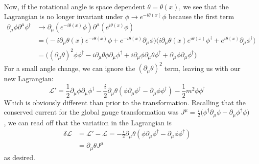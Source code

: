 \documentclass[12pt]{article}
\newcommand{\delmu}{\partial_{\mu}}
\newcommand{\delMu}{\partial^{\mu}}
\newcommand{\+}{\dagger}
\begin{document}
Now, if the rotational angle is space dependent $\theta = \theta(x)$, we see
that the Lagrangian is no longer invariant under $\phi \to e^{-i\theta(x)}\phi$
because the first term
\begin{align*}
    \delmu\phi\delMu\phi^{\dagger} &\to
    \delmu(e^{-i\theta(x)}\phi)\delMu(e^{i\theta(x)}\phi) \\ 
                                   &=
    \big(-i\delmu\theta(x)e^{-i\theta(x)}\phi + e^{-i\theta(x)}\delmu\phi \big)
    \big(i\delmu\theta(x)e^{i\theta(x)}\phi^{\dagger} +
    e^{i\theta(x)}\delmu\phi^{\dagger} \big) \\
                                   &=
    \big(
        (\delmu\theta)^2\phi\phi^{\+} -i\delmu\theta\phi\delmu\phi^{\+}
        + i\delmu\phi\delmu\theta\phi^{\+} + \delmu\phi\delmu\phi^{\+}
    \big)
\end{align*}
For a small angle change, we can ignore the $(\delmu\theta)^2$ term, leaving us
with our new Lagrangian:
\begin{equation*}
    \mathcal{L'} = 
    \frac{1}{2}\delmu\phi\delmu\phi^{\+} -
    \frac{i}{2}\delmu\theta(\phi\delmu\phi^{\+} - \delmu\phi\phi^{\+})
    - \frac{1}{2}m^2\phi\phi^{\+}
\end{equation*}
Which is obviously different than prior to the transformation. Recalling that 
the conserved current for the global gauge transformation was $J^{\mu} =
\frac{i}{2}\big(\phi^{\+}\delmu\phi - \delmu\phi^{\+}\phi\big)$, we can 
read off that the variation in the Lagrangian is
\begin{align*}
    \delta\mathcal{L} &= \mathcal{L'} - \mathcal{L} = 
    - \frac{i}{2}\delmu\theta(\phi\delmu\phi^{\+} - \delmu\phi\phi^{\+}) \\
                     &= \delmu\theta J^{\mu}
\end{align*}
as desired.
\end{document}
